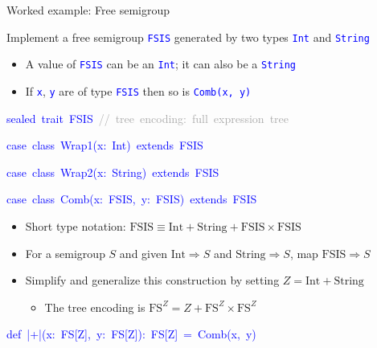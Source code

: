\documentclass[english,,russian]{beamer}
\newenvironment{lyxcode}
  {\par\begin{list}{}{
    \setlength{\rightmargin}{\leftmargin}
    \setlength{\listparindent}{0pt}%
    \raggedright
    \setlength{\itemsep}{0pt}
    \setlength{\parsep}{0pt}
    \normalfont\ttfamily}%
   \def\{{\char`\{}
   \def\}{\char`\}}
   \def\textasciitilde{\char`\~}
   \item[]}
  {\end{list}}
\begin{document}
\begin{frame}{Worked example: Free semigroup}

{\footnotesize{}\vspace{-0.15cm}}Implement a free semigroup \texttt{\textcolor{blue}{\footnotesize{}FSIS}}
generated by two types \texttt{\textcolor{blue}{\footnotesize{}Int}}
and \texttt{\textcolor{blue}{\footnotesize{}String}} 
\begin{itemize}
\item A value of \texttt{\textcolor{blue}{\footnotesize{}FSIS}} can be an
\texttt{\textcolor{blue}{\footnotesize{}Int}}; it can also be a \texttt{\textcolor{blue}{\footnotesize{}String}} 
\item If \texttt{\textcolor{blue}{\footnotesize{}x}}, \texttt{\textcolor{blue}{\footnotesize{}y}}
are of type \texttt{\textcolor{blue}{\footnotesize{}FSIS}} then so
is \texttt{\textcolor{blue}{\footnotesize{}Comb(x, y)}} 
\end{itemize}
\begin{lyxcode}
\textcolor{blue}{\footnotesize{}sealed~trait~FSIS~}\textcolor{darkgray}{\footnotesize{}//~tree~encoding:~full~expression~tree}{\footnotesize\par}

\textcolor{blue}{\footnotesize{}case~class~Wrap1(x:~Int)~extends~FSIS}{\footnotesize\par}

\textcolor{blue}{\footnotesize{}case~class~Wrap2(x:~String)~extends~FSIS}{\footnotesize\par}

\textcolor{blue}{\footnotesize{}case~class~Comb(x:~FSIS,~y:~FSIS)~extends~FSIS}{\footnotesize\par}
\end{lyxcode}
\begin{itemize}
\item {\footnotesize{}\vspace{-0.15cm}}Short type notation: $\text{FSIS}\equiv\text{Int}+\text{String}+\text{FSIS}\times\text{FSIS}$ 
\item For a semigroup $S$ and given $\text{Int}\Rightarrow S$ and $\text{String}\Rightarrow S$,
map $\text{FSIS}\Rightarrow S$
\item Simplify and generalize this construction by setting $Z=\text{Int}+\text{String}$
\begin{itemize}
\item The tree encoding is $\text{FS}^{Z}=Z+\text{FS}^{Z}\times\text{FS}^{Z}$
\end{itemize}
\end{itemize}
\begin{lyxcode}
\textcolor{blue}{\footnotesize{}def~|+|(x:~FS{[}Z{]},~y:~FS{[}Z{]}):~FS{[}Z{]}~=~Comb(x,~y)}{\footnotesize\par}


\end{lyxcode}
\end{frame}
\end{document}
